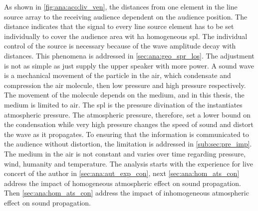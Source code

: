 
As shown in \autoref{fig:ana:aco:liv_ven}, the distances from one element in the line source array to the receiving audience dependent on the audience position. The distance indicates that the signal to every line source element has to be set individually to cover the audience area wit ha homogeneous \gls{spl}. The individual control of the source is necessary because of the wave amplitude decay with distances. This phenomena is addressed in \autoref{sec:ana:geo_spr_los}. The adjustment is not as simple as just supply the upper speaker with more power. A sound wave is a mechanical movement of the particle in the air, which condensate and compression the air molecule, then low pressure and high pressure respectively. The movement of the molecule depends on the medium, and in this thesis, the medium is limited to air. The \gls{spl} is the pressure divination of the instantiates atmospheric pressure. The atmospheric pressure, therefore, set a lower bound on the condensation while very high pressure changes the speed of sound and distort the wave as it propagates. To ensuring that the information is communicated to the audience without distortion, the limitation is addressed in \autoref{sub:sec:pre_imp}.  The medium in the air is not constant and varies over time regarding pressure, wind, humanity and temperature. The analysis starts with the experience for live concert of the author in \autoref{sec:ana:aut_exp_con}, next \autoref{sec:ana:hom_ats_con} address the impact of homogeneous atmospheric effect on sound propagation. Then \autoref{sec:ana:hom_ats_con} address the impact of  inhomogeneous atmospheric effect on sound propagation. 


